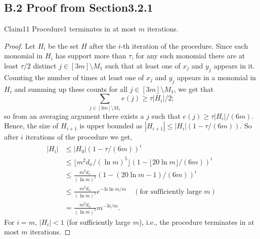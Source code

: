\subsection*{B.2 Proof from Section3.2.1}
\begin{authorclaim}{Claim11}
Procedure1 terminates in at most $m$ iterations.
\end{authorclaim}
\begin{proof}
Let $H_i$ be the set $H$ after the $i$-th iteration of the procedure. Since each monomial in $H_i$ has support more than $\tau$, for any such monomial there are at least $\tau/2$ distinct $j\in[3m]\setminus M_1$ such that at least one of $x_j$ and $y_j$ appears in it. Counting the number of times at least one of $x_j$ and $y_j$ appears in a monomial in $H_i$ and summing up these counts for all $j\in[3m]\setminus M_1$, we get that
\[
\sum_{j\in[3m]\setminus M_1}e(j)\ge\tau|H_i|/2;
\]
so from an averaging argument there exists a $j$ such that $e(j)\ge\tau|H_i|/(6m)$.
Hence, the size of $H_{i+1}$ is upper bounded as $|H_{i+1}|\le|H_i|(1-\tau/(6m))$.
So after $i$ iterations of the procedure we get,
\begin{align*}
|H_i|&\le|H_0|(1-\tau/(6m))^i\\
&\le\lfloor m^2d_x/(\ln m)^5\rfloor(1-\lfloor20\ln m\rfloor/(6m))^i\\
&\le\frac{m^2d_x}{(\ln m)^5}(1-(20\ln m-1)/(6m))^i\\
&\le\frac{m^2d_x}{(\ln m)^5}e^{-3i\ln m/m}\quad(\text{for sufficiently large }m)\\
&=\frac{m^2d_x}{(\ln m)^5}m^{-3i/m}.
\end{align*}
For $i=m$, $|H_i|<1$ (for sufficiently large $m$), i.e., the procedure terminates in at most $m$ iterations.
\end{proof}
